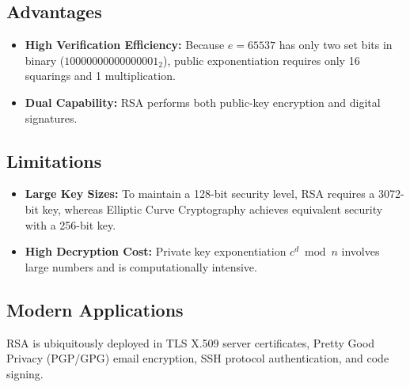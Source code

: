 \subsection{Advantages}
\begin{itemize}
    \item \textbf{High Verification Efficiency:} Because $e = 65537$ has only two set bits in binary ($10000000000000001_2$), public exponentiation requires only 16 squarings and 1 multiplication.
    \item \textbf{Dual Capability:} RSA performs both public-key encryption and digital signatures.
\end{itemize}

\subsection{Limitations}
\begin{itemize}
    \item \textbf{Large Key Sizes:} To maintain a 128-bit security level, RSA requires a 3072-bit key, whereas Elliptic Curve Cryptography achieves equivalent security with a 256-bit key.
    \item \textbf{High Decryption Cost:} Private key exponentiation $c^d \bmod n$ involves large numbers and is computationally intensive.
\end{itemize}

\subsection{Modern Applications}
RSA is ubiquitously deployed in TLS X.509 server certificates, Pretty Good Privacy (PGP/GPG) email encryption, SSH protocol authentication, and code signing.

